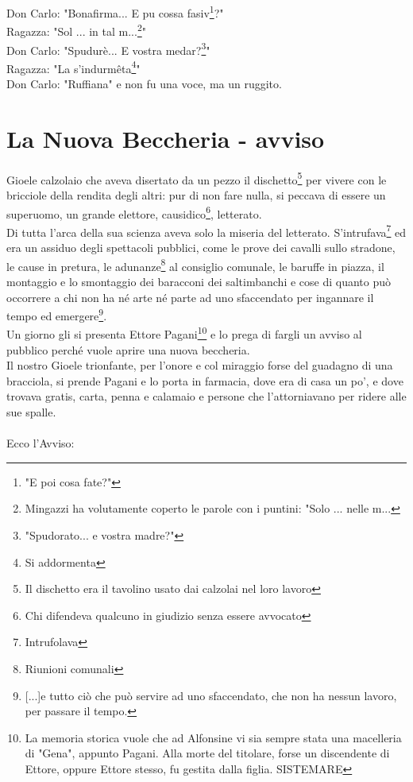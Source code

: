\documentclass[10pt]{memoir} %
\begin{document}
Don Carlo: "Bonafirma... E pu cossa fasiv\footnote{"E poi cosa fate?"}?"\\
Ragazza: "Sol ... in tal m...\footnote{Mingazzi ha volutamente coperto le parole con i puntini: "Solo ... nelle m...}"\\
Don Carlo: "Spudurè... E vostra medar?\footnote{"Spudorato... e vostra madre?"}"\\
Ragazza: "La s'indurmêta\footnote{Si addormenta}"\\
Don Carlo: "Ruffiana" e non fu una voce, ma un ruggito.\\



\chapter{La Nuova Beccheria - avviso}
Gioele calzolaio che aveva disertato da un pezzo il dischetto\footnote{Il dischetto era il tavolino usato dai calzolai nel loro lavoro} per vivere con le bricciole della rendita degli altri: pur di non fare nulla, si peccava di essere un superuomo, un grande elettore, causidico\footnote{Chi difendeva qualcuno in giudizio senza essere avvocato}, letterato.\\
Di tutta l'arca della sua scienza aveva solo la miseria del letterato. S'intrufava\footnote{Intrufolava} ed era un assiduo degli spettacoli pubblici, come le prove dei cavalli sullo stradone, le cause in pretura, le adunanze\footnote{Riunioni comunali} al consiglio comunale, le baruffe in piazza, il montaggio e lo smontaggio dei baracconi dei saltimbanchi e cose di quanto può occorrere a chi non ha né arte né parte ad uno sfaccendato per ingannare il tempo ed emergere\footnote{[...]e tutto ciò che può servire ad uno sfaccendato, che non ha nessun lavoro, per passare il tempo.}.\\
Un giorno gli si presenta Ettore Pagani\footnote{La memoria storica vuole che ad Alfonsine vi sia sempre stata una macelleria di "Gena", appunto Pagani. Alla morte del titolare, forse un discendente di Ettore, oppure Ettore stesso, fu gestita dalla figlia. SISTEMARE} e lo prega di fargli un avviso al pubblico perché vuole aprire una nuova beccheria. \\
Il nostro Gioele trionfante, per l'onore e col miraggio forse del guadagno di una bracciola, si prende Pagani e lo porta in farmacia, dove era di casa un po', e dove trovava gratis, carta, penna e calamaio e persone che l'attorniavano per ridere alle sue spalle.\\
\\
Ecco l'Avviso:
\end{document}
